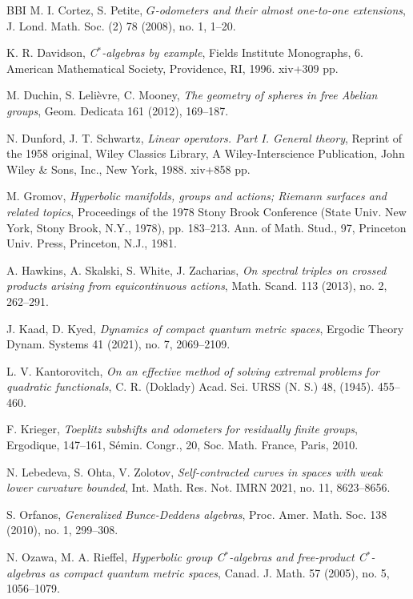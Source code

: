 \documentclass[a4paper,11pt,reqno]{amsart}
\numberwithin{equation}{section}
\numberwithin{equation}{section}
\theoremstyle{definition}
\theoremstyle{remark}
\theoremstyle{remark}
\begin{document}
\begin{thebibliography}{BBI}
 M. I. Cortez, S. Petite, \emph{$G$-odometers and
their almost one-to-one extensions}, J. Lond. Math. Soc. (2) 78 (2008),
no. 1, 1--20.

 K. R. Davidson, \emph{C$^{\ast}$-algebras by
example}, Fields Institute Monographs, 6. American Mathematical Society,
Providence, RI, 1996. xiv+309 pp.

 M. Duchin, S. Lelièvre, C. Mooney, \emph{The geometry
of spheres in free Abelian groups}, Geom. Dedicata 161 (2012), 169--187.

 N. Dunford, J. T. Schwartz, \emph{Linear
operators. Part I. General theory}, Reprint of the 1958 original,
Wiley Classics Library, A Wiley-Interscience Publication, John Wiley
\& Sons, Inc., New York, 1988. xiv+858 pp.

 M. Gromov, \emph{Hyperbolic manifolds, groups and
actions; Riemann surfaces and related topics}, Proceedings of the
1978 Stony Brook Conference (State Univ. New York, Stony Brook, N.Y.,
1978), pp. 183--213. Ann. of Math. Stud., 97, Princeton Univ. Press,
Princeton, N.J., 1981.

 A. Hawkins, A. Skalski, S. White, J. Zacharias,
\emph{On spectral triples on crossed products arising from equicontinuous
actions}, Math. Scand. 113 (2013), no. 2, 262--291.

 J. Kaad, D. Kyed, \emph{Dynamics of compact quantum metric spaces}, Ergodic Theory Dynam. Systems 41 (2021), no. 7, 2069--2109.

 L. V. Kantorovitch, \emph{On an effective method of solving extremal problems for quadratic functionals}, C. R. (Doklady) Acad. Sci. URSS (N. S.) 48, (1945). 455–460. 

 F. Krieger, \emph{Toeplitz subshifts and odometers
for residually finite groups}, Ergodique, 147--161, Sémin. Congr.,
20, Soc. Math. France, Paris, 2010.

 N. Lebedeva, S. Ohta, V. Zolotov, \emph{Self-contracted
curves in spaces with weak lower curvature bounded}, Int. Math. Res.
Not. IMRN 2021, no. 11, 8623--8656.

 S. Orfanos, \emph{Generalized Bunce-Deddens algebras},
Proc. Amer. Math. Soc. 138 (2010), no. 1, 299--308.

 N. Ozawa, M. A. Rieffel, \emph{Hyperbolic
group C$^{\ast}$-algebras and free-product C$^{\ast}$-algebras as
compact quantum metric spaces}, Canad. J. Math. 57 (2005), no. 5,
1056--1079.


\end{thebibliography}
\end{document}
